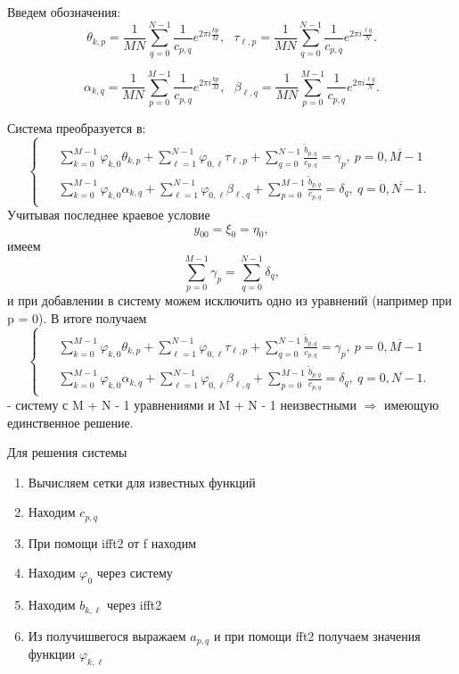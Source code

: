 \documentclass[11pt]{article}
\begin{document}
Введем обозначения:
$$\theta_{k, p} = \frac{1}{MN}\sum_{q=0}^{N-1}\frac{1}{c_{p,q}}e^{2\pi i \frac{kp}{M}},\ \ \ \tau_{\ell, p} = \frac{1}{MN}\sum_{q=0}^{N-1}\frac{1}{c_{p,q}}e^{2\pi i \frac{\ell q}{N}}.$$

$$\alpha_{k, q} = \frac{1}{MN}\sum_{p=0}^{M-1}\frac{1}{c_{p,q}}e^{2\pi i \frac{kp}{M}},\ \ \ \beta_{\ell, q} = \frac{1}{MN}\sum_{p=0}^{M-1}\frac{1}{c_{p,q}}e^{2\pi i \frac{\ell q}{N}}.$$

Система преобразуется в:
\begin{equation*}
\begin{cases}
\begin{aligned}
&\sum_{k=0}^{M-1}\varphi_{k, 0}\theta_{k, p} + \sum_{\ell=1}^{N-1}\varphi_{0, \ell}\tau_{\ell, p} + \sum_{q=0}^{N-1}\frac{\tilde{b}_{p,q}}{c_{p,q}} = \gamma_p, \ p = \overline{0, M-1}\\

&\sum_{k=0}^{M-1}\varphi_{k, 0}\alpha_{k, q} + \sum_{\ell=1}^{N-1}\varphi_{0, \ell}\beta_{\ell, q} + \sum_{p=0}^{M-1}\frac{\tilde{b}_{p,q}}{c_{p,q}} = \delta_q, \ q = \overline{0, N-1}.
\end{aligned}
\end{cases}
\end{equation*}
Учитывая последнее краевое условие
\[
y_{00} = \xi_0 = \eta_0,
\]
имеем
\[
\sum_{p=0}^{M-1}\gamma_p = \sum_{q=0}^{N-1}\delta_q,
\]
и при добавлении в систему можем исключить одно из уравнений (например при p = 0). В итоге получаем
\begin{equation*}
\begin{cases}
\begin{aligned}
&\sum_{k=0}^{M-1}\varphi_{k, 0}\theta_{k, p} + \sum_{\ell=1}^{N-1}\varphi_{0, \ell}\tau_{\ell, p} + \sum_{q=0}^{N-1}\frac{\tilde{b}_{p,q}}{c_{p,q}} = \gamma_p, \ p = \overline{0, M-1}\\

&\sum_{k=0}^{M-1}\varphi_{k, 0}\alpha_{k, q} + \sum_{\ell=1}^{N-1}\varphi_{0, \ell}\beta_{\ell, q} + \sum_{p=0}^{M-1}\frac{\tilde{b}_{p,q}}{c_{p,q}} = \delta_q, \ q = \overline{0, N-1}.
\end{aligned}
\end{cases}
\end{equation*}
- систему с M + N - 1 уравнениями и M + N - 1 неизвестными $\Rightarrow$ имеющую единственное решение.

Для решения системы

\begin{enumerate}
    \item Вычисляем сетки для известных функций
    \item Находим $c_{p, q}$
    \item При помощи ifft2 от f находим 
    \item Находим $\varphi_0$ через систему
    \item Находим $b_{k, \ell}$ через ifft2
    \item Из получишвегося выражаем $a_{p, q}$ и при помощи fft2 получаем значения функции $\varphi_{k,\ell }$
\end{enumerate}
\end{document}
